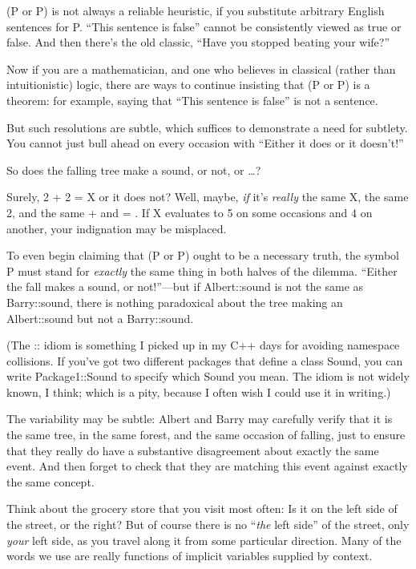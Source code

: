 {
 (P or {\textlnot}P) is not always a reliable heuristic, if you
substitute arbitrary English sentences for P. ``This
sentence is false'' cannot be consistently viewed as
true or false. And then there's the old classic,
``Have you stopped beating your
wife?''}

{
 Now if you are a mathematician, and one who believes in classical
(rather than intuitionistic) logic, there are ways to continue
insisting that (P or {\textlnot}P) is a theorem: for example, saying
that ``This sentence is false'' is
not a sentence.}

{
 But such resolutions are subtle, which suffices to demonstrate a
need for subtlety. You cannot just bull ahead on every occasion with
``Either it does or it
doesn't!''}

{
 So does the falling tree make a sound, or not, or \ldots ?}

{
 Surely, 2 + 2 = X or it does not? Well, maybe, \textit{if}
it's \textit{really} the same X, the same 2, and the
same + and = . If X evaluates to 5 on some occasions and 4 on another,
your indignation may be misplaced.}

{
 To even begin claiming that (P or {\textlnot}P) ought to be a
necessary truth, the symbol P must stand for \textit{exactly} the same
thing in both halves of the dilemma. ``Either the fall
makes a sound, or not!''---but if Albert::sound is
not the same as Barry::sound, there is nothing paradoxical about the
tree making an Albert::sound but not a Barry::sound.}

{
 (The :: idiom is something I picked up in my C++ days for avoiding
namespace collisions. If you've got two different
packages that define a class Sound, you can write Package1::Sound to
specify which Sound you mean. The idiom is not widely known, I think;
which is a pity, because I often wish I could use it in writing.)}

{
 The variability may be subtle: Albert and Barry may carefully
verify that it is the same tree, in the same forest, and the same
occasion of falling, just to ensure that they really do have a
substantive disagreement about exactly the same event. And then forget
to check that they are matching this event against exactly the same
concept.}

{
 Think about the grocery store that you visit most often: Is it on
the left side of the street, or the right? But of course there is no
``\textit{the} left side'' of the
street, only \textit{your} left side, as you travel along it from some
particular direction. Many of the words we use are really functions of
implicit variables supplied by context.}

